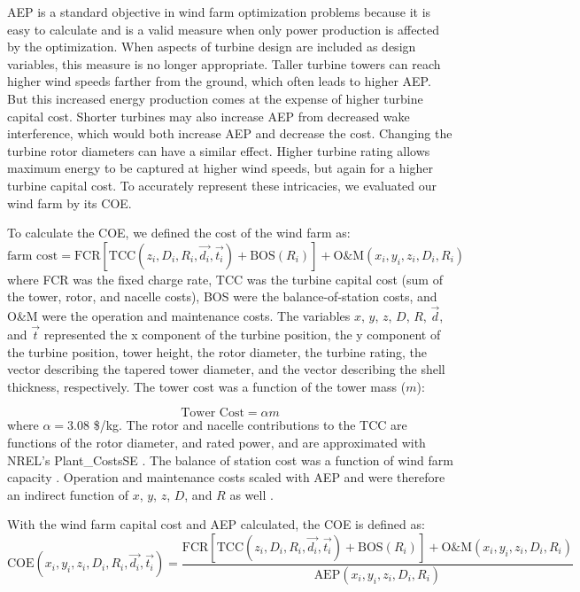 

AEP is a standard objective in wind farm optimization problems because it is easy to calculate and is a valid measure when only power production is affected by the optimization. When aspects of turbine design are included as design variables, this measure is no longer appropriate. 
Taller turbine towers can reach higher wind speeds farther from the ground, which often leads to higher AEP. But this increased energy production comes at the expense of higher turbine capital cost. Shorter turbines may also increase AEP from decreased wake interference, which would both increase AEP and decrease the cost. Changing the turbine rotor diameters can have a similar effect. Higher turbine rating allows maximum energy to be captured at higher wind speeds, but again for a higher turbine capital cost. To accurately represent these intricacies, we evaluated our wind farm by its COE.

To calculate the COE, we defined the cost of the wind farm as:
\begin{equation}
	\text{farm cost} = \text{FCR}[\text{TCC}(z_i, D_i, R_i, \vec{d_i}, \vec{t_i}) + \text{BOS}(R_i)] + \text{O\&M}(x_i,y_i,z_i, D_i, R_i)
\end{equation}
where FCR was the fixed charge rate, TCC was the turbine capital cost (sum of the tower, rotor, and nacelle costs), BOS were the balance-of-station costs, and O\&M were the operation and maintenance costs. The variables $x$, $y$, $z$, $D$, $R$, $\vec{d}$, and $\vec{t}$ represented the x component of the turbine position, the y component of the turbine position, tower height, the rotor diameter, the turbine rating, the vector describing the tapered tower diameter, and the vector describing the shell thickness, respectively. The tower cost was a function of the tower mass ($m$):

\begin{equation}
	\text{Tower Cost} = \alpha m
\end{equation}
%
where $\alpha = 3.08$ \$/kg. The rotor and nacelle contributions to the TCC are functions of the rotor diameter, and rated power, and are approximated with NREL's Plant\_CostsSE \citep{dykes2014plant_costsse}. The balance of station cost was a function of wind farm capacity \citep{BOS}. Operation and maintenance costs scaled with AEP and were therefore an indirect function of $x$, $y$, $z$, $D$, and $R$ as well \citep{mone2013cost}.

    With the wind farm capital cost and AEP calculated, the COE is defined as:
    \begin{equation}
			\text{COE}(x_i,y_i,z_i, D_i, R_i, \vec{d_i}, \vec{t_i}) = \frac{\text{FCR}[\text{TCC}(z_i, D_i, R_i, \vec{d_i}, \vec{t_i}) + \text{BOS}(R_i)] + \text{O\&M}(x_i,y_i,z_i, D_i, R_i)}{\text{AEP}(x_i,y_i,z_i,D_i,R_i)}
    \end{equation}
              